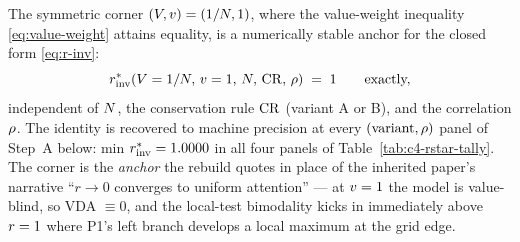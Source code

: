 The symmetric corner $(V, v) = (1/N, 1)$, where the
value-weight inequality \eqref{eq:value-weight} attains equality,
is a numerically stable anchor for the closed form
\eqref{eq:r-inv}:
%
\begin{equation}
  r^{*}_{\mathrm{inv}}(V = 1/N,\, v = 1,\, N,\, \mathrm{CR},\, \rho)
  \;=\; 1
  \qquad \text{exactly,}
  \label{eq:r-inv-corner}
\end{equation}
%
independent of $N$, the conservation rule $\mathrm{CR}$ (variant A or
B), and the correlation $\rho$. The identity is recovered to
machine precision at every $(\text{variant}, \rho)$ panel of
Step~A below: min $r^{*}_{\mathrm{inv}} = 1.0000$ in all four panels of
Table~\ref{tab:c4-rstar-tally}. The corner is the
\emph{anchor} the rebuild quotes in place of the inherited paper's
narrative ``$r \to 0$ converges to uniform attention'' --- at
$v = 1$ the model is value-blind, so VDA $\equiv 0$, and the
local-test bimodality kicks in immediately above $r = 1$ where
P1's left branch develops a local maximum at the grid edge.

